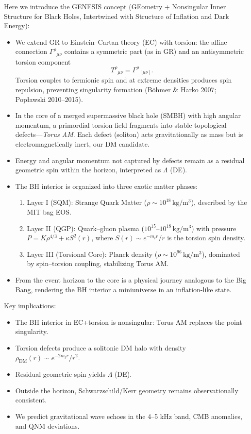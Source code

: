 \documentclass{article}
\begin{document}
Here we introduce the GENESIS concept (GEometry + Nonsingular Inner Structure for Black Holes, Intertwined with Structure of Inflation and Dark Energy):
\begin{itemize}
  \item We extend GR to Einstein–Cartan theory (EC) with torsion: the affine connection $\Gamma^\rho{}_{\mu\nu}$ contains a symmetric part (as in GR) and an antisymmetric torsion component
  \[ T^\rho{}_{\mu\nu} = \Gamma^\rho{}_{[\mu\nu]}. \]
  Torsion couples to fermionic spin and at extreme densities produces spin repulsion, preventing singularity formation (Böhmer \& Harko 2007; Popławski 2010–2015).
  \item In the core of a merged supermassive black hole (SMBH) with high angular momentum, a primordial torsion field fragments into stable topological defects—\emph{Torus AM}. Each defect (soliton) acts gravitationally as mass but is electromagnetically inert, our DM candidate.
  \item Energy and angular momentum not captured by defects remain as a residual geometric spin within the horizon, interpreted as $\Lambda$ (DE).
  \item The BH interior is organized into three exotic matter phases:
    \begin{enumerate}
      \item Layer I (SQM): Strange Quark Matter ($\rho\sim10^{18}\,\mathrm{kg/m^3}$), described by the MIT bag EOS.
      \item Layer II (QGP): Quark–gluon plasma ($10^{15}$–$10^{18}\,\mathrm{kg/m^3}$) with pressure $P = K\rho^{4/3} + \kappa S^2(r)$, where $S(r)\sim e^{-m_t r}/r$ is the torsion spin density.
      \item Layer III (Torsional Core): Planck density ($\rho\sim10^{96}\,\mathrm{kg/m^3}$), dominated by spin–torsion coupling, stabilizing Torus AM.
    \end{enumerate}
  \item From the event horizon to the core is a physical journey analogous to the Big Bang, rendering the BH interior a miniuniverse in an inflation-like state.
\end{itemize}

Key implications:
\begin{itemize}
  \item The BH interior in EC+torsion is nonsingular: Torus AM replaces the point singularity.
  \item Torsion defects produce a solitonic DM halo with density $\rho_{\mathrm{DM}}(r)\sim e^{-2m_t r}/r^2$.
  \item Residual geometric spin yields $\Lambda$ (DE).
  \item Outside the horizon, Schwarzschild/Kerr geometry remains observationally consistent.
  \item We predict gravitational wave echoes in the 4–5 kHz band, CMB anomalies, and QNM deviations.
\end{itemize}
\end{document}
